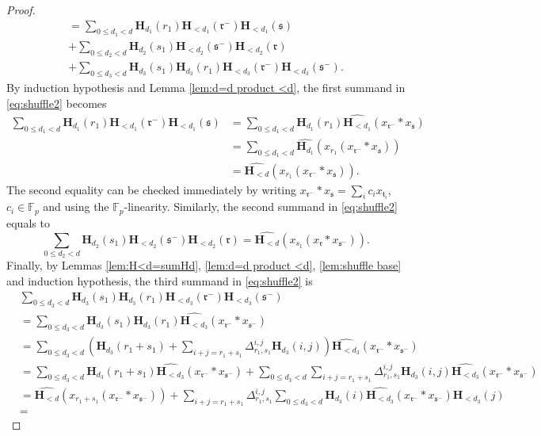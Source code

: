 \documentclass[12pt,reqno]{amsart}
\numberwithin{equation}{section}
\theoremstyle{plain}
\theoremstyle{definition}
\theoremstyle{remark}
\newcommand{\FF}{\mathbb{F}}
\newcommand{\ww}[1]{\mathfrak{#1}}
\renewcommand{\H}{\mathbf{H}}
\begin{document}
\begin{proof}
\begin{multline}
= \sum_{0\leq d_1<d} \H_{d_1}(r_1) \H_{<d_1}(\ww{r}^-) \H_{<d_1}(\ww{s}) \\
+ \sum_{0\leq d_2<d} \H_{d_2}(s_1) \H_{<d_2}(\ww{s}^-) \H_{<d_2}(\ww{r}) \\
+ \sum_{0\leq d_3<d} \H_{d_3}(s_1) \H_{d_3}(r_1) \H_{<d_3}(\ww{r}^-) \H_{<d_3}(\ww{s}^-).
\end{multline}
By induction hypothesis and Lemma \ref{lem:d=d product <d}, the first summand in \eqref{eq:shuffle2} becomes
    \begin{align*}
        \sum_{0\leq d_1<d}\H_{d_1}({r_1})\H_{<d_1}({\ww{r}^-})\H_{<d_1}(\ww{s})&=\sum_{0\leq d_1<d}\H_{d_1}(r_1)\widehat{\H_{<d_1}}(x_{\ww{r}^-}\ast x_{\ww{s}})\\
        &=
        \sum_{0\leq d_1<d}\widehat{\H_{d_1}}(x_{r_1}(x_{\ww{r}^-}\ast x_{\ww{s}}))
        \\
        &=\widehat{\H_{<d}}(x_{r_1}(x_{\ww{r}^-}\ast x_{\ww{s}})).
    \end{align*}
The second equality can be checked immediately by writing $x_{\ww{r}^-}\ast x_\ww{s}=\sum_{i}c_ix_{\ww{t}_i}$, $c_i\in\FF_p$ and using the $\FF_p$-linearity. Similarly, the second summand in \eqref{eq:shuffle2} equals to
    $$\sum_{0\leq d_2<d} \H_{d_2}(s_1) \H_{<d_2}(\ww{s}^-) \H_{<d_2}(\ww{r})=\widehat{\H_{<d}}(x_{s_1}(x_{\ww{r}}\ast x_{\ww{s}^-})).$$
Finally, by Lemmas \ref{lem:H<d=sumHd}, \ref{lem:d=d product <d}, \ref{lem:shuffle base} and induction hypothesis, the third summand in \eqref{eq:shuffle2} is
\begin{align*}
    &\sum_{0\leq d_3<d} \H_{d_3}(s_1) \H_{d_3}(r_1) \H_{<d_3}(\ww{r}^-) \H_{<d_3}(\ww{s}^-)\\
    &=\sum_{0\leq d_3<d}\H_{d_3}(s_1) \H_{d_3}(r_1) \widehat{\H_{<d_3}}(x_{\ww{r}^-}\ast x_{\ww{s}^-}) \\
    &=
    \sum_{0\leq d_3<d}\left(\H_{d_3}(r_1+s_1)+\sum_{{i+j=r_1+s_1}}\Delta_{r_1,s_1}^{i,j} \H_{d_3}(i,j)\right)\widehat{\H_{<d_3}}(x_{\ww{r}^-}\ast x_{\ww{s}^-})\\
    &=
    \sum_{0\leq d_3<d}\H_{d_3}(r_1+s_1)\widehat{\H_{<d_3}}(x_{\ww{r}^-}\ast x_{\ww{s}^-}) +\sum_{0\leq d_3<d}\sum_{{i+j=r_1+s_1}}\Delta_{r_1,s_1}^{i,j} \H_{d_3}(i,j)\widehat{\H_{<d_3}}(x_{\ww{r}^-}\ast x_{\ww{s}^-}) \\
    &=
    \widehat{\H_{<d}}(x_{r_1+s_1}(x_{\ww{r}^-}\ast x_{\ww{s}^-})) +\sum_{{i+j=r_1+s_1}}\Delta_{r_1,s_1}^{i,j}\sum_{0\leq d_3<d}\H_{d_3}(i)\widehat{\H_{<d_3}}(x_{\ww{r}^-}\ast x_{\ww{s}^-}) \H_{<d_3}(j)\\
    &=

\end{align*}
\end{proof}
\end{document}
